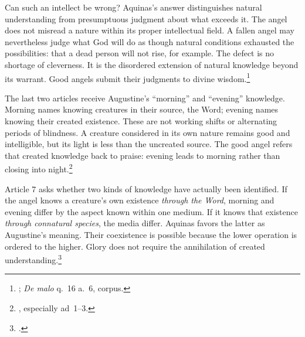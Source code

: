 Can such an intellect be wrong? Aquinas's answer distinguishes natural understanding from presumptuous judgment about what exceeds it. The angel does not misread a nature within its proper intellectual field. A fallen angel may nevertheless judge what God will do as though natural conditions exhausted the possibilities: that a dead person will not rise, for example. The defect is no shortage of cleverness. It is the disordered extension of natural knowledge beyond its warrant. Good angels submit their judgments to divine wisdom.\footnote{; \emph{De malo} q.~16 a.~6, corpus.}

The last two articles receive Augustine's ``morning'' and ``evening'' knowledge. Morning names knowing creatures in their source, the Word; evening names knowing their created existence. These are not working shifts or alternating periods of blindness. A creature considered in its own nature remains good and intelligible, but its light is less than the uncreated source. The good angel refers that created knowledge back to praise: evening leads to morning rather than closing into night.\footnote{, especially ad~1--3.}

Article 7 asks whether two kinds of knowledge have actually been identified. If the angel knows a creature's own existence \emph{through the Word}, morning and evening differ by the aspect known within one medium. If it knows that existence \emph{through connatural species}, the media differ. Aquinas favors the latter as Augustine's meaning. Their coexistence is possible because the lower operation is ordered to the higher. Glory does not require the annihilation of created understanding.\footnote{.}

